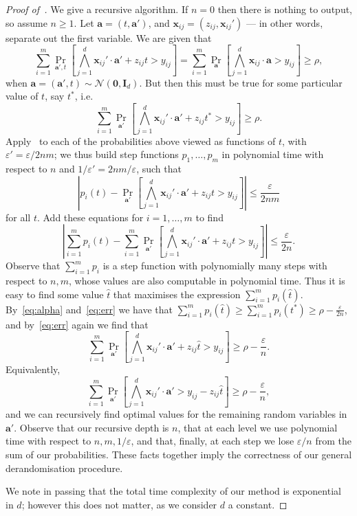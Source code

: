 \documentclass[a4paper,11pt, DIV=11]{scrartcl}
\newcommand{\vx}{\ensuremath{\mathbf{x}}}
\newcommand{\va}{\ensuremath{\mathbf{a}}}
\renewcommand{\epsilon}{\varepsilon}
\theoremstyle{plain}
\theoremstyle{definition}
\begin{document}
\begin{proof}[Proof of~]
    We give a recursive algorithm. If $n = 0$ then there is nothing to output, so assume $n \geq 1$. Let $\va = (t, \va')$, and $\vx_{ij} = (z_{ij}, \vx_{ij}')$ --- in other words, separate out the first variable. We are given that
    \begin{equation*}
    \sum_{i =1 }^m \Pr_{\mathbf{a}', t}\left[ \bigwedge_{j = 1}^d \vx_{ij}' \cdot \va' + z_{ij} t > y_{ij} \right] =
    \sum_{i =1 }^m \Pr_{\mathbf{a}}\left[ \bigwedge_{j = 1}^d \vx_{ij} \cdot \va > y_{ij} \right] \geq \rho,
    \end{equation*}
    when $\va = (\va', t) \sim \mathcal{N}(\mathbf{0}, \mathbf{I}_d)$. But then this must be true for some particular value of $t$, say $t^*$, i.e.
    \begin{equation}\label{eq:alpha}
    \sum_{i =1 }^m \Pr_{\va'}\left[ \bigwedge_{j = 1}^d \vx_{ij}' \cdot \va' + z_{ij} t^* > y_{ij} \right]  \geq \rho.
    \end{equation}
    Apply~ to each of the probabilities above viewed as functions of $t$, with $\epsilon' = \epsilon / 2nm$; we thus build step functions $p_1, \ldots, p_m$ in polynomial time with respect to $n$ and $1/\epsilon' = 2nm/\epsilon$, such that
    \[
    \left| p_i(t) -  \Pr_{\va'}\left[ \bigwedge_{j = 1}^d \vx_{ij}' \cdot \va' + z_{ij} t > y_{ij} \right] \right| \leq \frac{\epsilon}{2nm}
    \]
    for all $t$.
    Add these equations for $i = 1, \ldots, m$ to find
    \begin{equation}\label{eq:err}
    \left| \sum_{i = 1}^m p_i(t) -  \sum_{i = 1}^m \Pr_{\va'}\left[ \bigwedge_{j = 1}^d \vx_{ij}' \cdot \va' + z_{ij} t > y_{ij} \right] \right| \leq \frac{\epsilon}{2n}.
    \end{equation}
    Observe that $\sum_{i = 1}^m p_i$ is a step function with polynomially many steps with respect to $n, m$, whose values are also computable in polynomial time. Thus it is easy to find some value $\hat{t}$ that maximises the expression $\sum_{i = 1}^m p_i(\hat{t})$. By~\eqref{eq:alpha} and~\eqref{eq:err} we have that $\sum_{i = 1}^m p_i(\hat{t}) \geq \sum_{i = 1}^m p_i(t^*) \geq \rho - \frac{\epsilon}{2n}$, and by~\eqref{eq:err} again we find that
    \[
    \sum_{i = 1}^m \Pr_{\va'}\left[ \bigwedge_{j = 1}^d \vx_{ij}' \cdot \va' + z_{ij} \hat{t} > y_{ij} \right] \geq \rho - \frac{\epsilon}{n}.
    \]
    Equivalently,
    \[
    \sum_{i = 1}^m \Pr_{\va'}\left[ \bigwedge_{j = 1}^d \vx_{ij}' \cdot \va' > y_{ij} - z_{ij} \hat{t} \right] \geq \rho - \frac{\epsilon}{n},
    \]
    and we can recursively find optimal values for the remaining random variables in $\va'$. Observe that our recursive depth is $n$, that at each level we use polynomial time with respect to $n, m, 1 / \epsilon$, and that, finally, at each step we lose $\epsilon / n$ from the sum of our probabilities. These facts together imply the correctness of our general derandomisation procedure.

    We note in passing that the total time complexity of our method is exponential in $d$; however this does not matter, as we consider $d$ a constant.
\end{proof}
\end{document}
